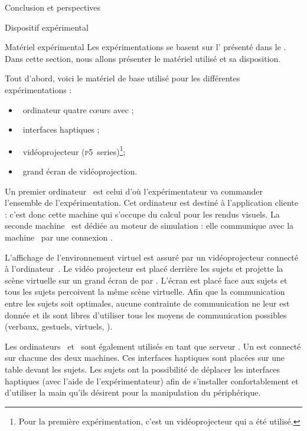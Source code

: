 \documentclass[myfrancais,ngerman,english,french]{mythesis}
\begin{document}
	\begin{mychapter+}{Conclusion et perspectives}
	\end{mychapter+}
	\mybiblio%
	\myglossary
	\myappendix
	\begin{mychapter}{Dispositif expérimental}
		\begin{mysection}{Matériel expérimental}
			Les expérimentations se basent sur l' présenté dans le .
			Dans cette section, nous allons présenter le matériel utilisé et sa disposition.

			Tout d'abord, voici le matériel de base utilisé pour les différentes expérimentations :
			\begin{itemize}
				\item {}~ordinateur quatre cœurs \myIntelCore avec ;
				\item {}~interfaces haptiques \myOmni;
				\item {}~vidéoprojecteur \myACER (\textsc{p5}~series)\footnote{Pour la première expérimentation, c'est un vidéoprojecteur \myCasioXJ qui a été utilisé.};
				\item {}~grand écran de vidéoprojection.
			\end{itemize}

			Un premier ordinateur~ est celui d'où l'expérimentateur va commander l'ensemble de l'expérimentation.
			Cet ordinateur est destiné à l'application cliente  : c'est donc cette machine qui s'occupe du calcul pour les rendus visuels.
			La seconde machine~ est dédiée au moteur de simulation  : elle communique avec la machine~ par une connexion \myTCPIP.

			L'affichage de l'environnement virtuel est assuré par un vidéoprojecteur connecté à l'ordinateur~.
			Le vidéo projecteur est placé derrière les sujets et projette la scène virtuelle sur un grand écran de  par .
			L'écran est placé face aux sujets et tous les sujets percoivent la même scène virtuelle.
			Afin que la communication entre les sujets soit optimales, aucune contrainte de communication ne leur est donnée et ils sont libres d'utiliser tous les moyens de communication possibles (verbaux, gestuels, virtuels, \myetc).

			Les ordinateurs~ et~ sont également utilisés en tant que serveur .
			Un \myOmni est connecté sur chacune des deux machines.
			Ces interfaces haptiques sont placées sur une table devant les sujets.
			Les sujets ont la possibilité de déplacer les interfaces haptiques (avec l'aide de l'expérimentateur) afin de s'installer confortablement et d'utiliser la main qu'ils désirent pour la manipulation du périphérique.


\end{mysection}
\end{mychapter}
\end{document}
